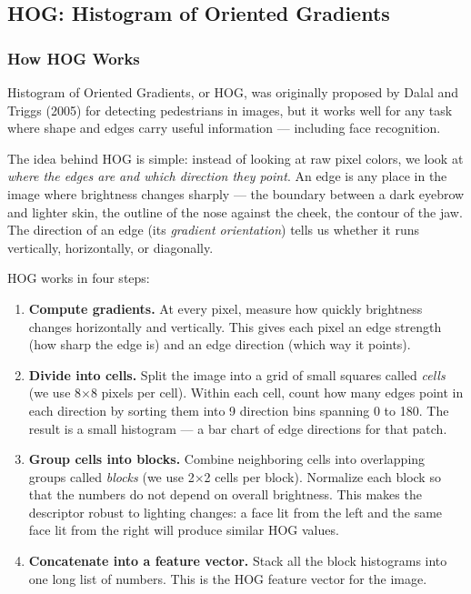 \documentclass[a4paper,10pt]{article}
\begin{document}
\subsection{HOG: Histogram of Oriented Gradients}

\subsubsection{How HOG Works}

Histogram of Oriented Gradients, or HOG, was originally proposed by Dalal and Triggs (2005) for detecting pedestrians in images, but it works well for any task where shape and edges carry useful information --- including face recognition.

The idea behind HOG is simple: instead of looking at raw pixel colors, we look at \textit{where the edges are and which direction they point}.
An edge is any place in the image where brightness changes sharply --- the boundary between a dark eyebrow and lighter skin, the outline of the nose against the cheek, the contour of the jaw.
The direction of an edge (its \textit{gradient orientation}) tells us whether it runs vertically, horizontally, or diagonally.

HOG works in four steps:

\begin{enumerate}
    \item \textbf{Compute gradients.} At every pixel, measure how quickly brightness changes horizontally and vertically. This gives each pixel an edge strength (how sharp the edge is) and an edge direction (which way it points).

    \item \textbf{Divide into cells.} Split the image into a grid of small squares called \textit{cells} (we use 8$\times$8 pixels per cell). Within each cell, count how many edges point in each direction by sorting them into 9 direction bins spanning 0\textdegree{} to 180\textdegree{}. The result is a small histogram --- a bar chart of edge directions for that patch.

    \item \textbf{Group cells into blocks.} Combine neighboring cells into overlapping groups called \textit{blocks} (we use 2$\times$2 cells per block). Normalize each block so that the numbers do not depend on overall brightness. This makes the descriptor robust to lighting changes: a face lit from the left and the same face lit from the right will produce similar HOG values.

    \item \textbf{Concatenate into a feature vector.} Stack all the block histograms into one long list of numbers. This is the HOG feature vector for the image.
\end{enumerate}
\end{document}
